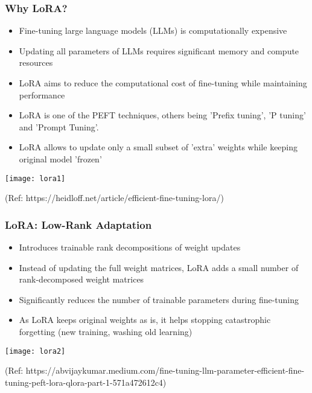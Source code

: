 \begin{frame}[fragile]\frametitle{Why LoRA?}
\begin{itemize}
    \item Fine-tuning large language models (LLMs) is computationally expensive
    \item Updating all parameters of LLMs requires significant memory and compute resources
    \item LoRA aims to reduce the computational cost of fine-tuning while maintaining performance
	\item LoRA is one of the PEFT techniques, others being 'Prefix tuning', 'P tuning' and 'Prompt Tuning'.
	\item LoRA allows to update only a small subset of 'extra' weights while keeping original model 'frozen'
\end{itemize}

		\begin{center}
		\texttt{[image: lora1]}
		
		{\tiny (Ref: https://heidloff.net/article/efficient-fine-tuning-lora/)}
		\end{center}

\end{frame}

\begin{frame}[fragile]\frametitle{LoRA: Low-Rank Adaptation}
\begin{itemize}
    \item Introduces trainable rank decompositions of weight updates
    \item Instead of updating the full weight matrices, LoRA adds a small number of rank-decomposed weight matrices
    \item Significantly reduces the number of trainable parameters during fine-tuning
	\item As LoRA keeps original weights as is, it helps stopping catastrophic forgetting (new training, washing old learning)
\end{itemize}

		\begin{center}
		\texttt{[image: lora2]}
		
		{\tiny (Ref: https://abvijaykumar.medium.com/fine-tuning-llm-parameter-efficient-fine-tuning-peft-lora-qlora-part-1-571a472612c4)}
		\end{center}

\end{frame}


